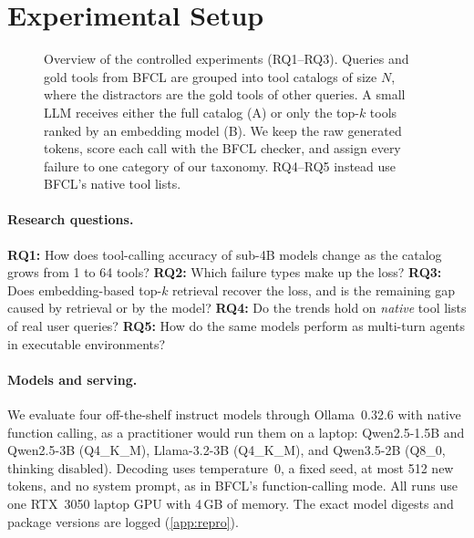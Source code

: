 \section{Experimental Setup}
\label{sec:setup}

\begin{figure}[t]
  \centering
  
  \caption{Overview of the controlled experiments (RQ1--RQ3). Queries and gold tools from BFCL are grouped into tool catalogs of size $N$, where the distractors are the gold tools of other queries. A small LLM receives either the full catalog (A) or only the top-$k$ tools ranked by an embedding model (B). We keep the raw generated tokens, score each call with the BFCL checker, and assign every failure to one category of our taxonomy. RQ4--RQ5 instead use BFCL's native tool lists.}
  \label{fig:overview}
\end{figure}

\paragraph{Research questions.}
\textbf{RQ1:} How does tool-calling accuracy of sub-4B models change as the catalog grows from 1 to 64 tools?
\textbf{RQ2:} Which failure types make up the loss?
\textbf{RQ3:} Does embedding-based top-$k$ retrieval recover the loss, and is the remaining gap caused by retrieval or by the model?
\textbf{RQ4:} Do the trends hold on \emph{native} tool lists of real user queries?
\textbf{RQ5:} How do the same models perform as multi-turn agents in executable environments?

\paragraph{Models and serving.}
We evaluate four off-the-shelf instruct models through Ollama~0.32.6 \citep{ollama2026} with native function calling, as a practitioner would run them on a laptop: Qwen2.5-1.5B and Qwen2.5-3B \citep{qwen2024qwen25} (Q4\_K\_M), Llama-3.2-3B \citep{grattafiori2024llama3, meta2024llama32card} (Q4\_K\_M), and Qwen3.5-2B \citep{qwen2026qwen35card} (Q8\_0, thinking disabled).
Decoding uses temperature~0, a fixed seed, at most 512 new tokens, and no system prompt, as in BFCL's function-calling mode.
All runs use one RTX~3050 laptop GPU with 4\,GB of memory.
The exact model digests and package versions are logged (\cref{app:repro}).

